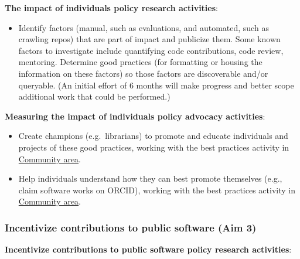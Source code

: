 \documentclass[
]{book}
\providecommand{\tightlist}{%
  \setlength{\itemsep}{0pt}\setlength{\parskip}{0pt}}
\begin{document}
\textbf{The impact of individuals policy research activities}:

\begin{itemize}
\tightlist
\item
  Identify factors (manual, such as evaluations, and automated, such as crawling repos) that are
  part of impact and publicize them. Some known factors to investigate include quantifying code
  contributions, code review, mentoring. Determine good practices (for formatting or housing the
  information on these factors) so those factors are discoverable and/or queryable.
  (An initial effort of 6 months will make progress and better scope additional work that could be performed.)
\end{itemize}

\textbf{Measuring the impact of individuals policy advocacy activities}:

\begin{itemize}
\item
  Create champions (e.g.~librarians) to promote and educate individuals and projects of these
  good practices, working with the best practices activity in \protect\hyperlink{Ch-Comm}{Community area}.
\item
  Help individuals understand how they can best promote themselves (e.g., claim software works on
  ORCID), working with the best practices activity in \protect\hyperlink{Ch-Comm}{Community area}.
\end{itemize}

\hypertarget{incentivize-contributions-to-public-software-aim-3}{%
\subsubsection{Incentivize contributions to public software (Aim 3)}\label{incentivize-contributions-to-public-software-aim-3}}

\textbf{Incentivize contributions to public software policy research activities}:
\end{document}
